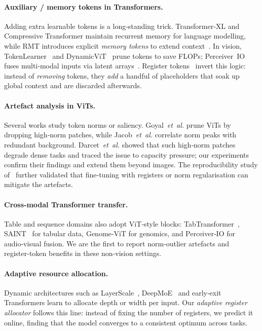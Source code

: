 \documentclass{article}
\newcommand{\citet}{\textcite}
\newcommand{\citep}{\parencite}
\begin{document}
\paragraph{Auxiliary / memory tokens in Transformers.}
Adding extra learnable tokens is a long‑standing trick.  Transformer‑XL and Compressive Transformer maintain recurrent memory for language modelling, while RMT introduces explicit \emph{memory tokens} to extend context~\citep{bulatovRecurrentMemoryTransformer2022}.  In vision, TokenLearner~\citep{ryooTokenLearner2022} and DynamicViT~\citep{raoDynamicViT2021} prune tokens to save FLOPs; Perceiver IO fuses multi‑modal inputs via latent arrays~\citep{jaeglePerceiverIO2021}.  Register tokens~\citep{darcetVisionTransformersNeedRegisters2024} invert this logic: instead of \emph{removing} tokens, they \emph{add} a handful of placeholders that soak up global context and are discarded afterwards.

\paragraph{Artefact analysis in ViTs.}
Several works study token norms or saliency.  Goyal \textit{et al.} prune ViTs by dropping high‑norm patches, while Jacob \textit{et al.} correlate norm peaks with redundant background.  Darcet \textit{et al.} showed that such high‑norm patches degrade dense tasks and traced the issue to capacity pressure; our experiments confirm their findings and extend them beyond images.  The reproducibility study of \citet{anonymousReproStudy2025} further validated that fine‑tuning with registers or norm regularisation can mitigate the artefacts.

\paragraph{Cross‑modal Transformer transfer.}
Table and sequence domains also adopt ViT‑style blocks: TabTransformer~\citep{huangTabTransformer2020}, SAINT~\citep{somepalliSAINT2021} for tabular data, Genome‑ViT for genomics, and Perceiver‑IO for audio‑visual fusion.  We are the first to report norm‑outlier artefacts and register‑token benefits in these non‑vision settings.

\paragraph{Adaptive resource allocation.}
Dynamic architectures such as LayerScale~\citep{touvronLayerScale2021}, DeepMoE~\citep{wangDeepMoE2021} and early‑exit Transformers learn to allocate depth or width per input.  Our \emph{adaptive register allocator} follows this line: instead of fixing the number of registers, we predict it online, finding that the model converges to a consistent optimum across tasks.
\end{document}
